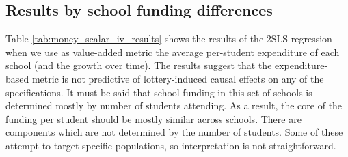 \documentclass[a4paper, article, english, oneside, unknownkeysallowed, 12pt]{memoir}
\begin{document}
\subsection{Results by school funding differences}


Table \ref{tab:money_scalar_iv_results} shows the results of the 2SLS regression when we use as value-added metric the average per-student expenditure of each school (and the growth over time).
The results suggest that the expenditure-based metric is not predictive of lottery-induced causal effects on any of the specifications. It must be said that school funding in this set of schools is determined mostly by number of students attending.
As a result, the core of the funding per student should be mostly similar across schools. There are components which are not determined by the number of students. Some of these attempt to target specific populations, so interpretation is not straightforward. 




















\clearpage
\printbibliography
\end{document}
